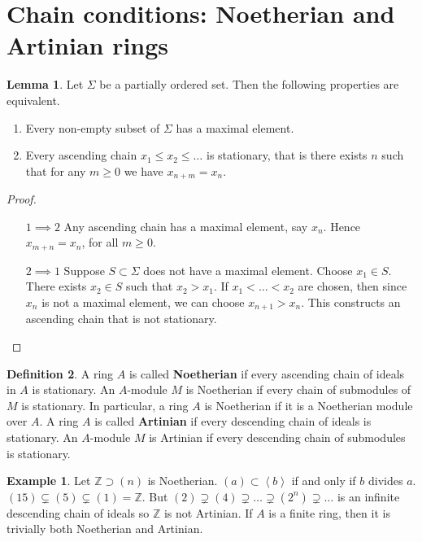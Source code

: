 \documentclass{article}
\newcommand{\Z}{\mathbb{Z}}
\newcommand{\rb}[1]{\left( #1 \right)}
\newcommand{\ab}[1]{\left\langle #1 \right\rangle}
\theoremstyle{definition}\newtheorem{definition}{Definition}[section]
\theoremstyle{definition}\newtheorem{remark}[definition]{Remark}
\theoremstyle{definition}\newtheorem*{example}{Example}
\theoremstyle{definition}\newtheorem*{note}{Note}
\newtheorem{lemma}[definition]{Lemma}
\begin{document}
\section{Chain conditions: Noetherian and Artinian rings}

\begin{lemma}
Let $ \Sigma $ be a partially ordered set. Then the following properties are equivalent.
\begin{enumerate}
\item Every non-empty subset of $ \Sigma $ has a maximal element.
\item Every ascending chain $ x_1 \le x_2 \le \dots $ is stationary, that is there exists $ n $ such that for any $ m \ge 0 $ we have $ x_{n + m} = x_n $.
\end{enumerate}
\end{lemma}

\begin{proof}
\hfill
\begin{itemize}[leftmargin=2cm]
\item[$ 1 \implies 2 $] Any ascending chain has a maximal element, say $ x_n $. Hence $ x_{m + n} = x_n $, for all $ m \ge 0 $.
\item[$ 2 \implies 1 $] Suppose $ S \subset \Sigma $ does not have a maximal element. Choose $ x_1 \in S $. There exists $ x_2 \in S $ such that $ x_2 > x_1 $. If $ x_1 < \dots < x_2 $ are chosen, then since $ x_n $ is not a maximal element, we can choose $ x_{n + 1} > x_n $. This constructs an ascending chain that is not stationary.
\end{itemize}
\end{proof}

\begin{definition}
A ring $ A $ is called \textbf{Noetherian} if every ascending chain of ideals in $ A $ is stationary. An $ A $-module $ M $ is Noetherian if every chain of submodules of $ M $ is stationary. In particular, a ring $ A $ is Noetherian if it is a Noetherian module over $ A $. A ring $ A $ is called \textbf{Artinian} if every descending chain of ideals is stationary. An $ A $-module $ M $ is Artinian if every descending chain of submodules is stationary.
\end{definition}

\begin{example}
Let $ \Z \supset \rb{n} $ is Noetherian. $ \rb{a} \subset \ab{b} $ if and only if $ b $ divides $ a $. $ \rb{15} \subsetneq \rb{5} \subsetneq \rb{1} = \Z $. But $ \rb{2} \supsetneq \rb{4} \supsetneq \dots \supsetneq \rb{2^n} \supsetneq \dots $ is an infinite descending chain of ideals so $ \Z $ is not Artinian. If $ A $ is a finite ring, then it is trivially both Noetherian and Artinian.
\end{example}
\end{document}
